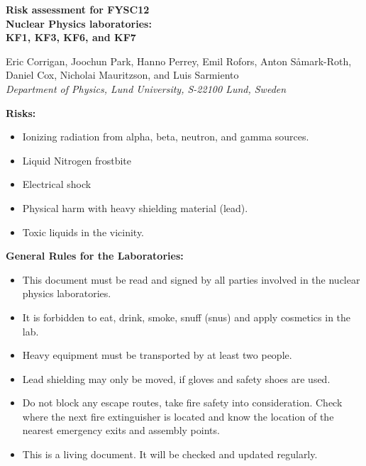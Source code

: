 \documentclass[11pt]{article}
\begin{document}
\begin{center}

  {\Large\bf\boldmath Risk assessment for FYSC12\\ Nuclear Physics
    laboratories:}\\[1mm] {\large\bf\boldmath \textsc{KF1}, \textsc{KF3},
    \textsc{KF6}, and \textsc{KF7}}\\
  \vspace*{4mm}

  {\footnotesize Eric Corrigan, Joochun Park, Hanno Perrey, Emil
    Rofors, Anton S{\aa}mark-Roth, Daniel Cox, Nicholai Mauritzson, and Luis
    Sarmiento}\\
  {\small\it Department of Physics, Lund University,
    S-22100 Lund, Sweden}\\

\end{center}

{\bf Risks:}
\begin{itemize}
\item Ionizing radiation from alpha, beta, neutron, and gamma sources.
\item Liquid Nitrogen frostbite
\item Electrical shock
\item Physical harm with heavy shielding material (lead).
\item Toxic liquids in the vicinity.
\end{itemize}

{\bf General Rules for the Laboratories:}
\begin{itemize}
\item This document must be read and signed by all parties involved in
  the nuclear physics laboratories.
\item It is forbidden to eat, drink, smoke, snuff (snus) and apply
  cosmetics in the lab.
\item Heavy equipment must be transported by at least two people.
\item Lead shielding may only be moved, if gloves and safety shoes are
  used.
\item Do not block any escape routes, take fire safety into
  consideration. Check where the next fire extinguisher is located and
  know the location of the nearest emergency exits and assembly
  points.
\item This is a living document. It will be checked and updated
  regularly.
\end{itemize}
\end{document}
